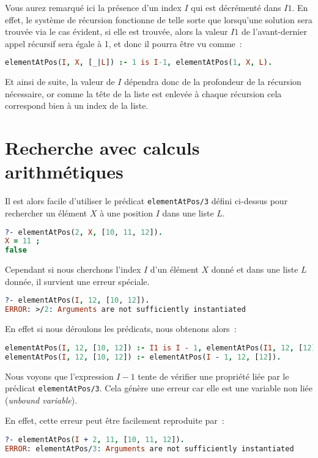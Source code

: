 Vous aurez remarqué ici la présence d'un index $I$ qui est décrémenté dans $I1$. En effet, le système de récursion fonctionne de telle sorte que lorsqu'une solution sera trouvée via le cas évident, si elle est trouvée, alors la valeur $I1$ de l'avant-dernier appel récursif sera égale à 1, et donc il pourra être vu comme~:
\begin{lstlisting}[language=Prolog,frame=single]
elementAtPos(I, X, [_|L]) :- 1 is I-1, elementAtPos(1, X, L).
\end{lstlisting}
Et ainsi de suite, la valeur de $I$ dépendra donc de la profondeur de la récursion nécessaire,
or comme la tête de la liste est enlevée à chaque récursion cela correspond bien à un index de la liste.

\section{Recherche avec calculs arithmétiques}

Il est alors facile d'utiliser le prédicat \texttt{elementAtPos/3} défini ci-dessus pour rechercher un élément $X$ à une position $I$ dans une liste $L$.
\begin{lstlisting}[language=Prolog,frame=single]
?- elementAtPos(2, X, [10, 11, 12]).
X = 11 ;
false
\end{lstlisting}

Cependant si nous cherchons l'index $I$ d'un élément
$X$ donné et dans une liste $L$ donnée, il survient une erreur spéciale.
\begin{lstlisting}[language=Prolog,frame=single]
?- elementAtPos(I, 12, [10, 12]).
ERROR: >/2: Arguments are not sufficiently instantiated
\end{lstlisting}

En effet si nous déroulons les prédicats, nous obtenons alors~:
\begin{lstlisting}[language=Prolog,frame=single]
elementAtPos(I, 12, [10, 12]) :- I1 is I - 1, elementAtPos(I1, 12, [12]).
elementAtPos(I, 12, [10, 12]) :- elementAtPos(I - 1, 12, [12]).
\end{lstlisting}

Nous voyons que l'expression $I - 1$ tente de vérifier une propriété liée par le prédicat
\texttt{elementAtPos/3}. Cela génère une erreur car elle est une variable non liée (\textit{unbound variable}).

En effet, cette erreur peut être facilement reproduite par~:
\begin{lstlisting}[language=Prolog,frame=single]
?- elementAtPos(I + 2, 11, [10, 11, 12]).
ERROR: elementAtPos/3: Arguments are not sufficiently instantiated
\end{lstlisting}

